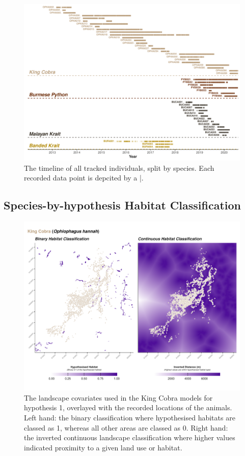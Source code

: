 \documentclass[10pt,a4paper]{article}
\begin{document}
\begin{figure}[h]
\includegraphics[width=1\linewidth]{../../figures/timeLinePlot} \caption{The timeline of all tracked individuals, split by species. Each recorded data point is depcited by a |.}\label{fig:timeLinePlot}
\end{figure}

\subsection{Species-by-hypothesis Habitat Classification}\label{species-by-hypothesis-habitat-classification}

\begin{figure}[h]
\includegraphics[width=1\linewidth]{../../figures/landscape_plot_OPHA_H1} \caption{The landscape covariates used in the King Cobra models for hypothesis 1, overlayed with the recorded locations of the animals. Left hand: the binary classification where hypothesised habitats are classed as 1, whereas all other areas are classed as 0. Right hand: the inverted continuous landscape classification where higher values indicated proximity to a given land use or habitat.}\label{fig:landscapePlotOPHA1}
\end{figure}
\end{document}
